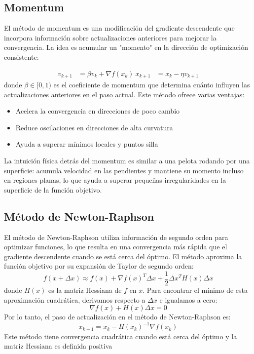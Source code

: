 \documentclass{tp02}
\begin{document}
\subsection{Momentum}
El método de momentum es una modificación del gradiente descendente que incorpora
información sobre actualizaciones anteriores para mejorar la convergencia. La idea es
acumular un "momento" en la dirección de optimización consistente:

\begin{equation}
\begin{aligned}
v_{k+1} &= \beta v_k + \nabla f(x_k) \
x_{k+1} &= x_k - \eta v_{k+1}
\end{aligned}
\end{equation}
donde $\beta \in [0,1)$ es el coeficiente de momentum que determina cuánto influyen
las actualizaciones anteriores en el paso actual. Este método ofrece varias ventajas:
\begin{itemize}
\item Acelera la convergencia en direcciones de poco cambio
\item Reduce oscilaciones en direcciones de alta curvatura
\item Ayuda a superar mínimos locales y puntos silla
\end{itemize}

La intuición física detrás del momentum es similar a una pelota rodando por una
superficie: acumula velocidad en las pendientes y mantiene su momento incluso en
regiones planas, lo que ayuda a superar pequeñas irregularidades en la superficie de
la función objetivo.

\subsection{Método de Newton-Raphson}

El método de Newton-Raphson utiliza información de segundo orden para optimizar
funciones, lo que resulta en una convergencia más rápida que el gradiente descendente
cuando se está cerca del óptimo. El método aproxima la función objetivo por su
expansión de Taylor de segundo orden:
\begin{equation}
f(x + \Delta x) \approx f(x) + \nabla f(x)^T\Delta x + \frac{1}{2}\Delta x^T H(x)\Delta x
\end{equation}
donde $H(x)$ es la matriz Hessiana de $f$ en $x$. Para encontrar el mínimo de esta
aproximación cuadrática, derivamos respecto a $\Delta x$ e igualamos a cero:
\begin{equation}
\nabla f(x) + H(x)\Delta x = 0
\end{equation}
Por lo tanto, el paso de actualización en el método de Newton-Raphson es:
\begin{equation}
x_{k+1} = x_k - H(x_k)^{-1}\nabla f(x_k)
\end{equation}
Este método tiene convergencia cuadrática cuando está cerca del óptimo y la matriz
Hessiana es definida positiva
\end{document}
